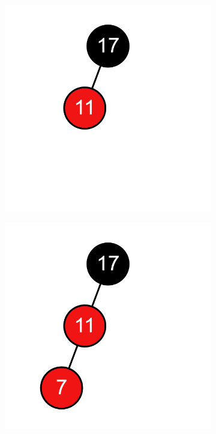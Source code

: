 \documentclass[11pt,a4paper]{article}
\begin{document}
\begin{loesung}
\begin{enumerate}[label=\alph*)]
\begin{enumerate}[label=\roman*)]
\begin{figure}[h!]
\begin{subfigure}[t]{0.15\textwidth}
                    \includegraphics[width=\textwidth]{img/2b/4}
                \end{subfigure}
                \begin{subfigure}[t]{0.15\textwidth}
                    \centering
                    \includegraphics[width=\textwidth]{img/2b/5}

\end{subfigure}
\end{figure}
\end{enumerate}
\end{enumerate}
\end{loesung}
\end{document}
